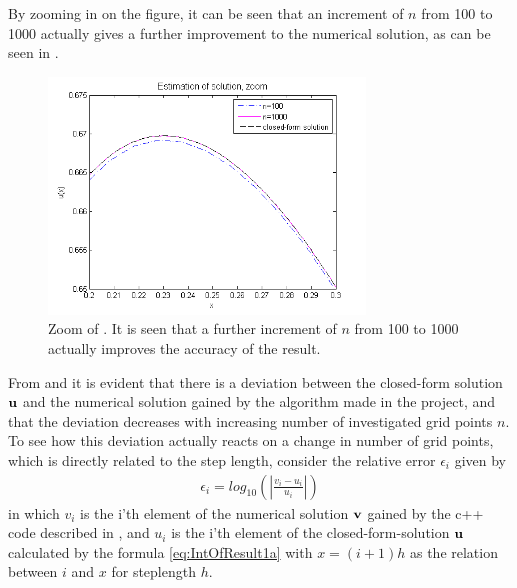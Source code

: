 By zooming in on the figure, it can be seen that an increment of $n$ from 100 to 1000 actually gives a further improvement to the numerical solution, as can be seen in .   
\begin{figure}[H]
	\centering
	\includegraphics[width=0.75\textwidth]{Figures/estimaition_of_solution_zoom.png}
	\caption{Zoom of . It is seen that a further increment of $n$ from 100 to 1000 actually improves the accuracy of the result.}
	\label{fig:IntOfResult2}
\end{figure}

From  and  it is evident that there is a deviation between the closed-form solution $\mbox{\textbf{u}}$ and the numerical solution gained by the algorithm made in the project, and that the deviation decreases with increasing number of investigated grid points $n$.
To see how this deviation actually reacts on a change in number of grid points, which is directly related to the step length, consider the relative error $\epsilon_i$ given by
\begin{align}
	\epsilon_i=log_{10}\left(\left|\frac{v_i-u_i}
                 {u_i}\right|\right)
    \label{eq:IntOfResult1}
\end{align}
in which $v_i$ is the i'th element of the numerical solution $\mbox{\textbf{v}}$ gained by the c++ code described in , and $u_i$ is the i'th element of the closed-form-solution $\mbox{\textbf{u}}$ calculated by the formula \eqref{eq:IntOfResult1a} with $x=(i+1)h$ as the relation between $i$ and $x$ for steplength $h$.  

